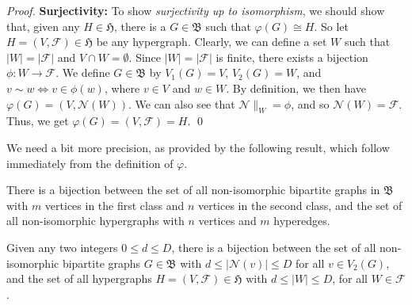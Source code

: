 \begin{proof}
\textbf{Surjectivity:}
To show \emph{surjectivity up to isomorphism}, we should show that, given any $H \in \mathfrak{H}$, there is a $G \in \mathfrak{B}$ such that $\varphi(G) \cong H$.
So let $H = (V, \mathcal{F}) \in \mathfrak{H}$ be any hypergraph.
Clearly, we can define a set $W$ such that $| W | = | \mathcal{F} |$ and $V \cap W = \emptyset$.
Since $| W | = | \mathcal{F} |$ is finite, there exists a bijection $\phi: W \rightarrow \mathcal{F}$.
We define $G \in \mathfrak{B}$ by $V_1(G) = V$, $V_2(G) = W$, and $v \sim w \Leftrightarrow v \in \phi(w)$, where $v \in V$ and $w \in W$.
By definition, we then have $\varphi(G) = (V, \mathcal{N}(W))$.
We can also see that $\mathcal{N} \|_{W} = \phi$, and so $\mathcal{N}(W) = \mathcal{F}$.
Thus, we get $\varphi(G) = (V, \mathcal{F}) = H$.
\qed
\end{proof}

We need a bit more precision, as provided by the following result, which follow immediately from the definition of $\varphi$.

\begin{corollary}
There is a bijection between the set of all non-isomorphic bipartite graphs in $\mathfrak{B}$ with $m$ vertices in the first class and $n$ vertices in the second class, and the set of all non-isomorphic hypergraphs with $n$ vertices and $m$ hyperedges.
\end{corollary}

\begin{corollary}
Given any two integers $0 \leq d \leq D$, there is a bijection between the set of all non-isomorphic bipartite graphs $G \in \mathfrak{B}$ with $d \leq | \mathcal{N}(v) | \leq D$ for all $v \in V_2(G)$, and the set of all hypergraphs $H = (V, \mathcal{F}) \in \mathfrak{H}$ with $d \leq | W | \leq D$, for all $W \in \mathcal{F}$.
\end{corollary}
